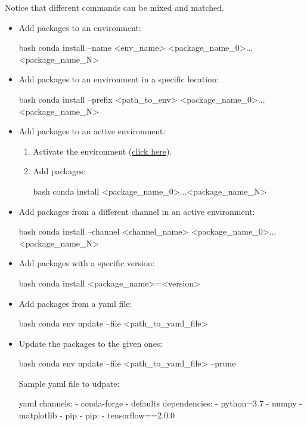 Notice that different commands can be mixed and matched.
\begin{itemize}
    \item Add packages to an environment:
    \begin{mintedbox}{bash}
conda install --name <env_name> <package_name_0>...<package_name_N>
    \end{mintedbox}
    \item Add packages to an environment in a specific location:
    \begin{mintedbox}{bash}
conda install --prefix <path_to_env> <package_name_0>...<package_name_N>
    \end{mintedbox}
    \item Add packages to an active environment:
    \begin{enumerate}
        \item Activate the environment (\hyperref[conda:activateEnv]{click here}).
        \item Add packages:
        \begin{mintedbox}{bash}
conda install <package_name_0>...<package_name_N>
        \end{mintedbox}
    \end{enumerate}
    \item Add packages from a different channel in an active environment:
    \begin{mintedbox}{bash}
conda install --channel <channel_name> <package_name_0>...<package_name_N>
    \end{mintedbox}
    \item Add packages with a specific version:
    \begin{mintedbox}{bash}
conda install <package_name>=<version>
    \end{mintedbox}
    \item Add packages from a yaml file:
    \begin{mintedbox}{bash}
conda env update --file <path_to_yaml_file>
    \end{mintedbox}
    \item Update the packages to the given ones:
    \begin{mintedbox}{bash}
conda env update --file <path_to_yaml_file> --prune
    \end{mintedbox}
    Sample yaml file to udpate:
    \begin{mintedbox}{yaml}
        channels:
            - conda-forge
            - defaults
        dependencies:
            - python=3.7
            - numpy
            - matplotlib
            - pip
            - pip:
                - tensorflow==2.0.0
            \end{mintedbox}
\end{itemize}


